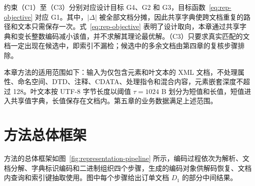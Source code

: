 约束（C1）至（C3）分别对应设计目标 G4、G2 和 G3，目标函数~\eqref{eq:rep-objective} 对应 G1。其中，$|\Delta|$ 被全部文档分摊，因此共享字典使跨文档重复的路径和文本只需保存一次。式~\eqref{eq:rep-objective} 表明了设计取向，本章通过共享字典和变长整数编码减小该值，并不求解其理论最优解。（C3）只要求真实匹配的文档一定出现在候选中，即索引不漏检；候选中的多余文档由第四章的复核步骤排除。

本章方法的适用范围如下：输入为仅包含元素和叶文本的 XML 文档，不处理属性、命名空间、DTD、注释、CDATA、处理指令和混合内容，元素嵌套深度不超过 128。叶文本按 UTF-8 字节长度以阈值 $\tau=1024$ B 划分为短值和长值，短值进入共享值字典，长值保存在文档内。第五章的业务数据满足上述范围。

\section{方法总体框架}
\label{sec:rep-framework}

方法的总体框架如图~\ref{fig:representation-pipeline} 所示，编码过程依次为解析、文档分解、字典标识编码和二进制组织四个步骤，生成的编码对象供解码恢复、文档内查询和索引键抽取使用。图中每个步骤给出订单文档 $D_1$ 的部分中间结果。

